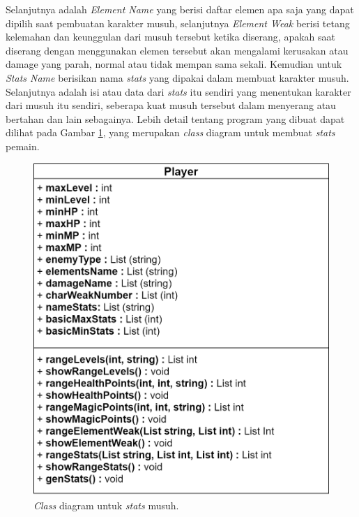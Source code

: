 Selanjutnya adalah \textit{Element Name} yang berisi daftar elemen apa saja yang dapat dipilih saat pembuatan karakter musuh, selanjutnya \textit{Element Weak} berisi tetang kelemahan dan keunggulan dari musuh tersebut ketika diserang, apakah saat diserang dengan menggunakan elemen tersebut akan mengalami kerusakan atau damage yang parah, normal atau tidak mempan sama sekali. Kemudian untuk \textit{Stats Name} berisikan nama \textit{stats} yang dipakai dalam membuat karakter musuh. Selanjutnya adalah isi atau data dari \textit{stats} itu sendiri yang menentukan karakter dari musuh itu sendiri, seberapa kuat musuh tersebut dalam menyerang atau bertahan dan lain sebagainya. Lebih detail tentang program yang dibuat dapat dilihat pada Gambar \ref{fig:enemy_uml}, yang merupakan \textit{class} diagram untuk membuat \textit{stats} pemain.
\vspace{1ex}

\begin{figure} [!h] \centering
	\includegraphics[scale=0.30]{img/enemy_uml.png}
	\caption{\textit{Class} diagram untuk \textit{stats} musuh.}
	\label{fig:enemy_uml}
\end{figure}


